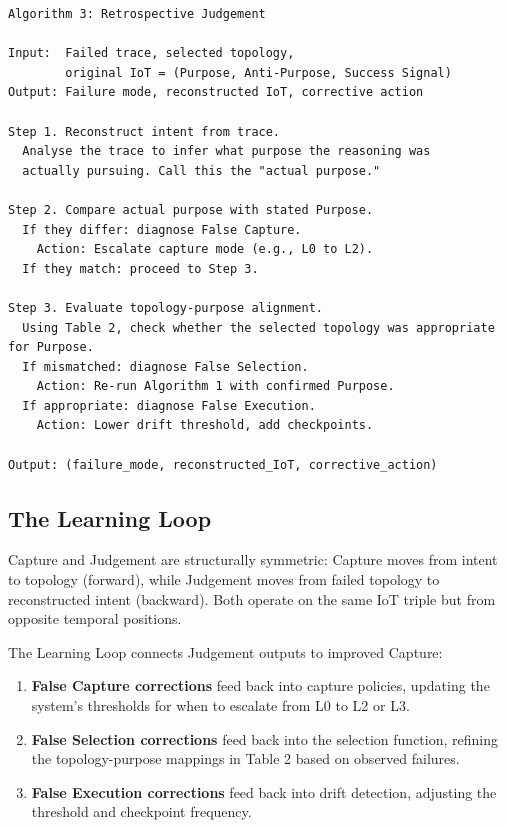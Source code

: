 \documentclass[11pt,a4paper]{article}
\providecommand{\tightlist}{%
  \setlength{\itemsep}{0pt}\setlength{\parskip}{0pt}}
\begin{document}
\begin{verbatim}
Algorithm 3: Retrospective Judgement

Input:  Failed trace, selected topology,
        original IoT = (Purpose, Anti-Purpose, Success Signal)
Output: Failure mode, reconstructed IoT, corrective action

Step 1. Reconstruct intent from trace.
  Analyse the trace to infer what purpose the reasoning was
  actually pursuing. Call this the "actual purpose."

Step 2. Compare actual purpose with stated Purpose.
  If they differ: diagnose False Capture.
    Action: Escalate capture mode (e.g., L0 to L2).
  If they match: proceed to Step 3.

Step 3. Evaluate topology-purpose alignment.
  Using Table 2, check whether the selected topology was appropriate for Purpose.
  If mismatched: diagnose False Selection.
    Action: Re-run Algorithm 1 with confirmed Purpose.
  If appropriate: diagnose False Execution.
    Action: Lower drift threshold, add checkpoints.

Output: (failure_mode, reconstructed_IoT, corrective_action)
\end{verbatim}

\subsection{The Learning Loop}\label{the-learning-loop}

Capture and Judgement are structurally symmetric: Capture moves from
intent to topology (forward), while Judgement moves from failed topology
to reconstructed intent (backward). Both operate on the same IoT triple
but from opposite temporal positions.

The Learning Loop connects Judgement outputs to improved Capture:

\begin{enumerate}
\def\labelenumi{\arabic{enumi}.}
\tightlist
\item
  \textbf{False Capture corrections} feed back into capture policies,
  updating the system's thresholds for when to escalate from L0 to L2 or
  L3.
\item
  \textbf{False Selection corrections} feed back into the selection
  function, refining the topology-purpose mappings in Table 2 based on
  observed failures.
\item
  \textbf{False Execution corrections} feed back into drift detection,
  adjusting the threshold and checkpoint frequency.
\end{enumerate}
\end{document}
